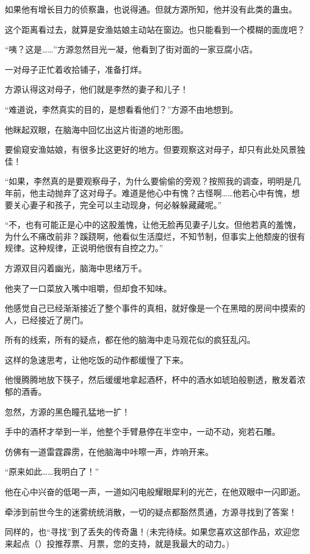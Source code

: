 \begin{this_body}
如果他有增长目力的侦察蛊，也说得通。但就方源所知，他并没有此类的蛊虫。

这个距离看过去，就算是安渔姑娘主动站在窗边。也只能看到一个模糊的面庞吧？

“咦？这是……”方源忽然目光一凝，他看到了街对面的一家豆腐小店。

一对母子正忙着收拾铺子，准备打烊。

方源认得这对母子，他们就是李然的妻子和儿子！

“难道说，李然真实的目的，是想看看他们？”方源不由地想到。

他眯起双眼，在脑海中回忆出这片街道的地形图。

要偷窥安渔姑娘，有很多比这更好的地方。但要观察这对母子，却只有此处风景独佳！

“如果，李然真的是要观察母子，为什么要偷偷的旁观？按照我的调查，明明是几年前，他主动抛弃了这对母子。难道是他心中有愧？古怪啊……他若心中有愧，想要关心妻子和孩子，完全可以主动现身，何必躲躲藏藏呢。”

“不，也有可能正是心中的这股羞愧，让他无脸再见妻子儿女。但他若真的羞愧，为什么不痛改前非？蹊跷啊，他看似生活糜烂，不知节制，但事实上他颓废的很有规律。这种规律，正说明他很有自控之力。”

方源双目闪着幽光，脑海中思绪万千。

他夹了一口菜放入嘴中咀嚼，但却食不知味。

他感觉自己已经渐渐接近了整个事件的真相，就好像是一个在黑暗的房间中摸索的人，已经接近了房门。

所有的线索，所有的疑点，都在他的脑海中走马观花似的疯狂乱闪。

这样的急速思考，让他吃饭的动作都缓慢了下来。

他慢腾腾地放下筷子，然后缓缓地拿起酒杯，杯中的酒水如琥珀般剔透，散发着浓郁的酒香。

忽然，方源的黑色瞳孔猛地一扩！

手中的酒杯才举到一半，他整个手臂悬停在半空中，一动不动，宛若石雕。

仿佛有一道雷霆霹雳，在他脑海中咔嚓一声，炸响开来。

“原来如此……我明白了！”

他在心中兴奋的低喝一声，一道如闪电般耀眼犀利的光芒，在他双眼中一闪即逝。

牵涉到前世今生的迷雾统统消散，一切的疑点都豁然贯通，方源寻找到了答案！

同样的，也“寻找”到了丢失的传奇蛊！(未完待续。如果您喜欢这部作品，欢迎您来起点（）投推荐票、月票，您的支持，就是我最大的动力。)

\end{this_body}

